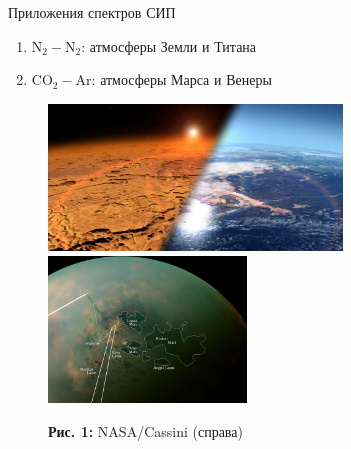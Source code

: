 \documentclass[10pt,usenames,pdf,hyperref={unicode},dvipsnames]{beamer}
\newcommand{\mycaption}[2]{
    \textbf{#1:} #2
}
\begin{document}
\begin{frame}{Приложения спектров СИП}
    \vspace*{-0.1cm}
    \begin{enumerate}
        \item N$_2-$N$_2$: атмосферы Земли и Титана  \\
        \item CO$_2-$Ar: атмосферы Марса и Венеры  \\
    \end{enumerate}

    \begin{figure}[H]
        \includegraphics[width=0.49\linewidth, height = 3.9cm]{./pictures/early_mars.pdf}
        \includegraphics[width=0.49\linewidth, height = 3.9cm]{./pictures/titan.jpg}
        \mycaption{Рис. 1}{NASA/Cassini (справа)}
    \end{figure}
\end{frame}
\end{document}
